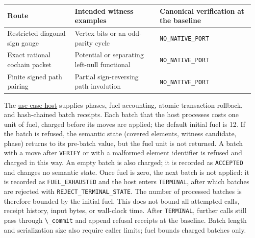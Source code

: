 \documentclass[
  11pt,
]{article}
\newcommand{\passthrough}[1]{#1}
\begin{document}
\begin{longtable}[]{@{}
  >{\raggedright\arraybackslash}p{}
  >{\raggedright\arraybackslash}p{}
  >{\raggedright\arraybackslash}p{}@{}}
\toprule\noalign{}
\begin{minipage}[b]{\linewidth}\raggedright
Route
\end{minipage} & \begin{minipage}[b]{\linewidth}\raggedright
Intended witness examples
\end{minipage} & \begin{minipage}[b]{\linewidth}\raggedright
Canonical verification at the baseline
\end{minipage} \\
\midrule\noalign{}
\endhead
\bottomrule\noalign{}
\endlastfoot
Restricted diagonal sign gauge & Vertex bits or an odd-parity cycle &
\nolinkurl{NO_NATIVE_PORT} \\
Exact rational cochain packet & Potential or separating left-null
functional & \nolinkurl{NO_NATIVE_PORT} \\
Finite signed path pairing & Partial sign-reversing path involution &
\nolinkurl{NO_NATIVE_PORT} \\
\end{longtable}

The
\href{https://github.com/dbccpage/the_symbol_game/blob/52cb5457f6c485ba548cfd292f6012a941ed22cf/pfp/use_cases/mssn_sn_demos/demo_3/host.py}{use-case
host} supplies phases, fuel accounting, atomic transaction rollback, and
hash-chained batch receipts. Each batch that the host processes costs
one unit of fuel, charged before its moves are applied; the default
initial fuel is 12. If the batch is refused, the semantic state (covered
elements, witness candidate, phase) returns to its pre-batch value, but
the fuel unit is not returned. A batch with a move after
\passthrough{\lstinline!VERIFY!} or with a malformed element identifier
is refused and charged in this way. An empty batch is also charged; it
is recorded as \passthrough{\lstinline!ACCEPTED!} and changes no
semantic state. Once fuel is zero, the next batch is not applied: it is
recorded as \nolinkurl{FUEL_EXHAUSTED} and the host enters
\passthrough{\lstinline!TERMINAL!}, after which batches are rejected
with \nolinkurl{REJECT_TERMINAL_STATE}. The number of processed batches
is therefore bounded by the initial fuel. This does not bound all
attempted calls, receipt history, input bytes, or wall-clock time. After
\passthrough{\lstinline!TERMINAL!}, further calls still pass through
\passthrough{\lstinline!\_commit!} and append refusal receipts at the
baseline. Batch length and serialization size also require caller
limits; fuel bounds charged batches only.
\end{document}
